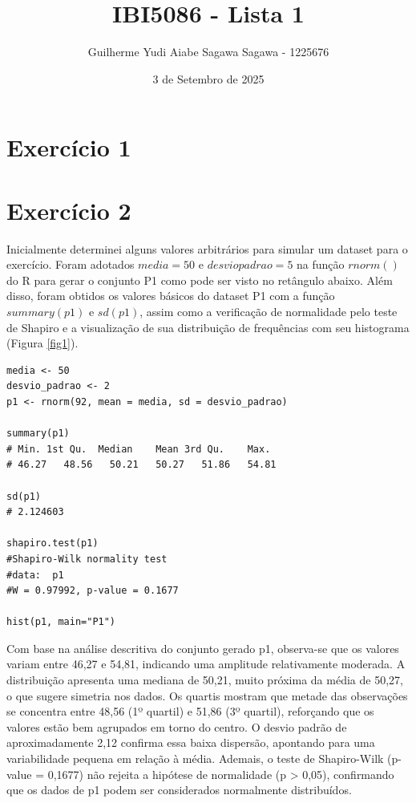 \documentclass{article}
\title{IBI5086 - Lista 1}
\author{Guilherme Yudi Aiabe Sagawa Sagawa - 1225676}
\date{3 de Setembro de 2025}
\begin{document}
\maketitle
\section{Exercício 1}



\section{Exercício 2}

Inicialmente determinei alguns valores arbitrários para simular um dataset para o exercício. Foram adotados $media = 50$ e $desvio padrao = 5$ na função $rnorm()$ do R para gerar o conjunto P1 como pode ser visto no retângulo abaixo. Além disso, foram obtidos os valores básicos do dataset P1 com a função $summary(p1)$ e $sd(p1)$, assim como a verificação de normalidade pelo teste de Shapiro e a visualização de sua distribuição de frequências com seu histograma (Figura \ref{fig1}).

\begin{lstlisting}
media <- 50
desvio_padrao <- 2
p1 <- rnorm(92, mean = media, sd = desvio_padrao)

summary(p1)
# Min. 1st Qu.  Median    Mean 3rd Qu.    Max. 
# 46.27   48.56   50.21   50.27   51.86   54.81 

sd(p1)
# 2.124603

shapiro.test(p1)
#Shapiro-Wilk normality test
#data:  p1
#W = 0.97992, p-value = 0.1677

hist(p1, main="P1")
\end{lstlisting}

Com base na análise descritiva do conjunto gerado p1, observa-se que os valores variam entre 46,27 e 54,81, indicando uma amplitude relativamente moderada. A distribuição apresenta uma mediana de 50,21, muito próxima da média de 50,27, o que sugere simetria nos dados. Os quartis mostram que metade das observações se concentra entre 48,56 (1º quartil) e 51,86 (3º quartil), reforçando que os valores estão bem agrupados em torno do centro. O desvio padrão de aproximadamente 2,12 confirma essa baixa dispersão, apontando para uma variabilidade pequena em relação à média. Ademais, o teste de Shapiro-Wilk (p-value = 0,1677) não rejeita a hipótese de normalidade (p > 0,05), confirmando que os dados de p1 podem ser considerados normalmente distribuídos.
\end{document}
